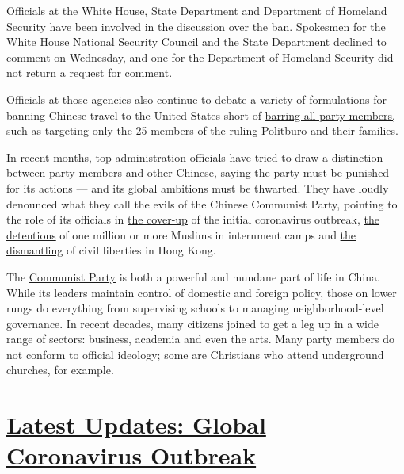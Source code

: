 Officials at the White House, State Department and Department of
Homeland Security have been involved in the discussion over the ban.
Spokesmen for the White House National Security Council and the State
Department declined to comment on Wednesday, and one for the Department
of Homeland Security did not return a request for comment.

Officials at those agencies also continue to debate a variety of
formulations for banning Chinese travel to the United States short of
\href{https://www.nytimes.com/2020/07/16/world/asia/china-communist-party-travel-ban-explain.html}{barring
all party members,} such as targeting only the 25 members of the ruling
Politburo and their families.

In recent months, top administration officials have tried to draw a
distinction between party members and other Chinese, saying the party
must be punished for its actions --- and its global ambitions must be
thwarted. They have loudly denounced what they call the evils of the
Chinese Communist Party, pointing to the role of its officials in
\href{https://www.nytimes.com/2020/03/29/world/asia/coronavirus-china.html}{the
cover-up} of the initial coronavirus outbreak,
\href{https://www.nytimes.com/interactive/2019/11/16/world/asia/china-xinjiang-documents.html}{the
detentions} of one million or more Muslims in internment camps and
\href{https://www.nytimes.com/2020/06/29/world/asia/china-hong-kong-security-law-rules.html}{the
dismantling} of civil liberties in Hong Kong.

The
\href{https://www.nytimes.com/2018/01/05/sunday-review/china-military-economic-power.html}{Communist
Party} is both a powerful and mundane part of life in China. While its
leaders maintain control of domestic and foreign policy, those on lower
rungs do everything from supervising schools to managing
neighborhood-level governance. In recent decades, many citizens joined
to get a leg up in a wide range of sectors: business, academia and even
the arts. Many party members do not conform to official ideology; some
are Christians who attend underground churches, for example.

\hypertarget{latest-updates-global-coronavirus-outbreak}{%
\section{\texorpdfstring{\href{https://www.nytimes.com/2020/08/01/world/coronavirus-covid-19.html?action=click\&pgtype=Article\&state=default\&region=MAIN_CONTENT_1\&context=storylines_live_updates}{Latest
Updates: Global Coronavirus
Outbreak}}{Latest Updates: Global Coronavirus Outbreak}}\label{latest-updates-global-coronavirus-outbreak}}

